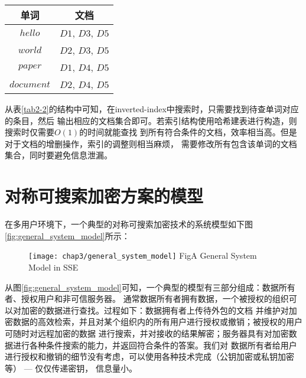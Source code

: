 \begin{enumerate}
  \begin{table}[h]
  \centering
  \begin{tabular}[t]{|c|c|}
  \hline
    单词 &       文档 \\
    \hline
    $hello$ & $D1$,   $D3$,   $D5$  \\
    \hline
    $world$ & $D2$,   $D3$,   $D5$ \\
    \hline
    $paper$ & $D1$,   $D4$,   $D5$ \\
    \hline
    $document$ & $D2$,   $D4$,   $D5$  \\
    \hline
  \end{tabular}
  \end{table}

  从表\ref{tab2-2}的结构中可知，在inverted-index中搜索时，只需要找到待查单词对应的条目，然后
  输出相应的文档集合即可。若索引结构使用哈希建表进行构造，则搜索时仅需要$O(1)$的时间就能查找
  到所有符合条件的文档，效率相当高。但是对于文档的增删操作，索引的调整则相当麻烦，
  需要修改所有包含该单词的文档集合，同时要避免信息泄漏。


\end{enumerate}


\section{对称可搜索加密方案的模型}
\label{sec:search_symm_scheme_model}

在多用户环境下，一个典型的对称可搜索加密技术的系统模型如下图\ref{fig:general_system_model}所示：


\begin{figure}[!htp]
  \centering
  \texttt{[image: chap3/general\_system\_model]}
  {Fig}{A General System Model in SSE}
\end{figure}


从图\ref{fig:general_system_model}可知，一个典型的模型有三部分组成：数据所有者、授权用户和非可信服务器。
通常数据所有者拥有数据，一个被授权的组织可以对加密的数据进行查找。过程如下：数据拥有者上传待外包的文档
并维护对加密数据的高效检索，并且对某个组织内的所有用户进行授权或撤销；被授权的用户可随时对远程加密的数据
进行搜索，并对接收的结果解密；服务器具有对加密数据进行各种条件搜索的能力，并返回符合条件的答案。我们对
数据所有者给用户进行授权和撤销的细节没有考虑，可以使用各种技术完成（公钥加密或私钥加密等） --- 仅仅传递密钥，
信息量小。



